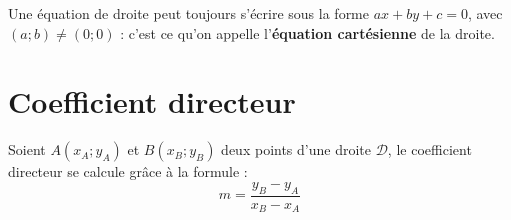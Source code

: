    

\smallskip

\begin{rem}{}{}
  Une équation de droite peut toujours s'écrire sous la forme $ax+by+c=0$, avec $(a;b)\neq(0;0)$ : c'est ce qu'on appelle l'\textbf{équation cartésienne} de la droite.
\end{rem}

\section{Coefficient directeur}

\begin{defi}{}{}
   Soient $A(x_A;y_A)$ et $B(x_B;y_B)$ deux points d'une droite $\mathcal{D}$, le coefficient directeur se calcule grâce à la formule : $$m=\frac{y_B-y_A}{x_B-x_A}$$
\end{defi}

